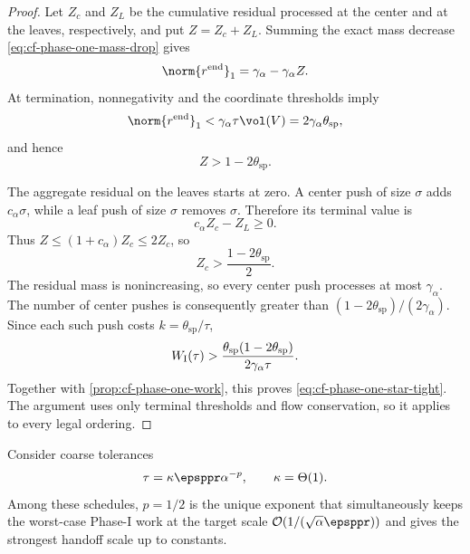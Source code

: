 \begin{proof}
Let \(Z_c\) and \(Z_L\) be the cumulative residual processed at the center
and at the leaves, respectively, and put \(Z=Z_c+Z_L\).  Summing the exact
mass decrease \cref{eq:cf-phase-one-mass-drop} gives
\begin{equation}
    \norm{r^{\rm end}}_1
    =\gamma_\alpha-\gamma_\alpha Z.
    \label{eq:cf-coarse-star-total-flow}
\end{equation}
At termination, nonnegativity and the coordinate thresholds imply
\begin{equation}
    \norm{r^{\rm end}}_1
    <\gamma_\alpha\tau\vol(V)
    =2\gamma_\alpha\theta_{\mathrm{sp}},
\end{equation}
and hence
\begin{equation}
    Z>1-2\theta_{\mathrm{sp}}.
    \label{eq:cf-coarse-star-processed-flow}
\end{equation}

The aggregate residual on the leaves starts at zero.  A center push of size
\(\sigma\) adds \(c_\alpha\sigma\), while a leaf push of size \(\sigma\)
removes \(\sigma\).  Therefore its terminal value is
\begin{equation}
    c_\alpha Z_c-Z_L\geq0.
    \label{eq:cf-coarse-star-leaf-flow}
\end{equation}
Thus \(Z\leq(1+c_\alpha)Z_c\leq2Z_c\), so
\begin{equation}
    Z_c>\frac{1-2\theta_{\mathrm{sp}}}{2}.
    \label{eq:cf-coarse-star-center-flow}
\end{equation}
The residual mass is nonincreasing, so every center push processes at most
\(\gamma_\alpha\).  The number of center pushes is consequently greater than
\((1-2\theta_{\mathrm{sp}})/(2\gamma_\alpha)\).  Since each such push costs
\(k=\theta_{\mathrm{sp}}/\tau\),
\begin{equation}
    W_{\rm I}(\tau)
    >
    \frac{\theta_{\mathrm{sp}}(1-2\theta_{\mathrm{sp}})}
         {2\gamma_\alpha\tau}.
    \label{eq:cf-coarse-star-explicit-lower}
\end{equation}
Together with \cref{prop:cf-phase-one-work}, this proves
\cref{eq:cf-phase-one-star-tight}.  The argument uses only terminal
thresholds and flow conservation, so it applies to every legal ordering.
\end{proof}

\begin{corollary}
\label{cor:cf-pareto-scale}
Consider coarse tolerances
\begin{equation}
    \tau=\kappa\epsppr\alpha^{-p},
    \qquad \kappa=\Theta(1).
    \label{eq:cf-power-switch}
\end{equation}
Among these schedules, \(p=1/2\) is the unique exponent that simultaneously
keeps the worst-case Phase-I work at the target scale
\(\mathcal O(1/(\sqrt\alpha\epsppr))\) and gives the strongest handoff
scale up to constants.
\end{corollary}

